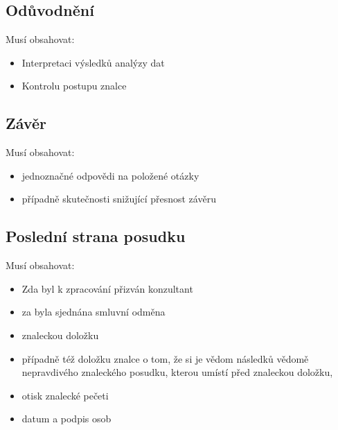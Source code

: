 \subsection{Odůvodnění}
Musí obsahovat:
\begin{itemize}
    \item Interpretaci výsledků analýzy dat
    \item Kontrolu postupu znalce
\end{itemize}
\subsection{Závěr}
Musí obsahovat:
\begin{itemize}
    \item jednoznačné odpovědi na položené otázky
    \item případně skutečnosti snižující přesnost závěru
\end{itemize}
\subsection{Poslední strana posudku}
Musí obsahovat:
\begin{itemize}
    \item Zda byl k zpracování přizván konzultant
    \item za byla sjednána smluvní odměna
    \item znaleckou doložku
    \item případně též doložku znalce o tom, že si je vědom následků vědomě
    nepravdivého znaleckého posudku, kterou umístí před znaleckou doložku,
    \item otisk znalecké pečeti
    \item datum a podpis osob
\end{itemize}
